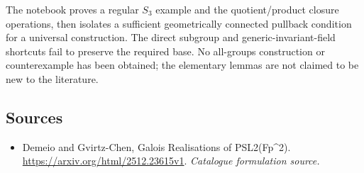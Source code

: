 \documentclass[11pt,a4paper]{article}
\numberwithin{equation}{section}
\begin{document}
The notebook proves a regular $S_3$ example and the quotient/product
closure operations, then isolates a sufficient geometrically connected
pullback condition for a universal construction.  The direct subgroup
and generic-invariant-field shortcuts fail to preserve the required
base.  No all-groups construction or counterexample has been obtained;
the elementary lemmas are not claimed to be new to the literature.
\subsection{Sources}
\begin{itemize}\raggedright
\item[\textnormal{[S1]}]\hypertarget{source:120:1}{} Demeio and Gvirtz-Chen, Galois Realisations of PSL2(Fp\textasciicircum{}2).
\url{https://arxiv.org/html/2512.23615v1}.
{\small\textit{Catalogue formulation source.}}
\end{itemize}
\end{document}
